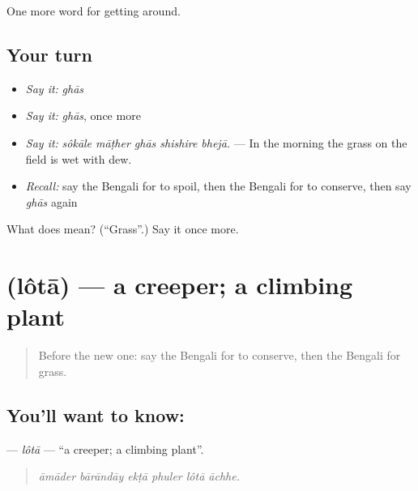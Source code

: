 \begin{grammarlens}[title={What you've built}]
One more word for getting around.
\end{grammarlens}

\subsection*{Your turn}
\begin{itemize}
\raggedright
  \item \emph{Say it:} \emph{ghās}
  \item \emph{Say it:} \emph{ghās}, once more
  \item \emph{Say it:} \emph{sôkāle māṭher ghās shishire bhejā.} — In the morning the grass on the field is wet with dew.
  \item \emph{Recall:} say the Bengali for to spoil, then the Bengali for to conserve, then say \emph{ghās} again
\end{itemize}

\begin{tcolorbox}[breakable,colback=teal!4,colframe=teal!35!black,title={Before you move on}]
What does  mean? (\textquotedblleft{}Grass\textquotedblright{}.) Say it once more.
\end{tcolorbox}
\section[\texorpdfstring{\bn{লতা} (lôtā)}{লতা (lôtā)}]{ (lôtā) — a creeper; a climbing plant}

\label{lesson:BN-C435-lota}



\begin{quote}
Before the new one: say the Bengali for to conserve, then the Bengali for grass.
\end{quote}

\subsection*{You'll want to know: }
\textbf{} — \emph{lôtā} — \textquotedblleft{}a creeper; a climbing plant\textquotedblright{}.

\begin{quote}
     
\end{quote}

\begin{quote}
\emph{āmāder bārāndāy ekṭā phuler lôtā āchhe.}
\end{quote}

